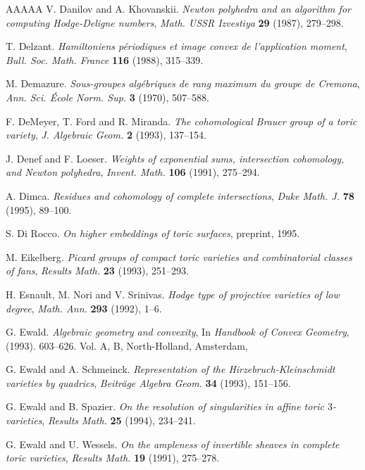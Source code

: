\documentclass{amsart}
\theoremstyle{plain}
\theoremstyle{definition}
\begin{document}
\begin{thebibliography}{AAAAA}
V. Danilov and A. Khovanskii. \textit{Newton polyhedra and an algorithm for computing Hodge-Deligne numbers}, \textit{Math. USSR Izvestiya} \textbf{29} (1987), 279--298.

T. Delzant. \textit{Hamiltoniens p\'eriodiques et image convex de l'application moment}, \textit{Bull. Soc. Math. France} \textbf{116} (1988), 315--339.

M. Demazure. \textit{Sous-groupes alg\'ebriques de rang maximum du groupe de Cremona}, \textit{Ann. Sci. \'Ecole Norm. Sup.} \textbf{3} (1970), 507--588.

F. DeMeyer, T. Ford and R. Miranda. \textit{The cohomological Brauer group of a toric variety}, \textit{J. Algebraic Geom.} \textbf{2} (1993), 137--154.

J. Denef and F. Loeser. \textit{Weights of exponential sums, intersection cohomology, and Newton polyhedra}, \textit{Invent. Math.} \textbf{106} (1991), 275--294.

A. Dimca. \textit{Residues and cohomology of complete intersections}, \textit{Duke Math. J.} \textbf{78} (1995), 89--100.

S. Di Rocco. \textit{On higher embeddings of toric surfaces}, preprint, 1995.

M. Eikelberg. \textit{Picard groups of compact toric varieties and combinatorial classes of fans}, \textit{Results Math.} \textbf{23} (1993), 251--293.

H. Esnault, M. Nori and V. Srinivas. \textit{Hodge type of projective varieties of low degree}, \textit{Math. Ann.} \textbf{293} (1992), 1--6.

G. Ewald. \textit{Algebraic geometry and convexity}, In \textit{Handbook of Convex Geometry}, (1993). 603--626. Vol. A, B, North-Holland, Amsterdam,

G. Ewald and A. Schmeinck. \textit{Representation of the Hirzebruch-Kleinschmidt varieties by quadrics}, \textit{Beitr\"age Algebra Geom.} \textbf{34} (1993), 151--156.

G. Ewald and B. Spazier. \textit{On the resolution of singularities in affine toric $3$-varieties}, \textit{Results Math.} \textbf{25} (1994), 234--241.

G. Ewald and U. Wessels. \textit{On the ampleness of invertible sheaves in complete toric varieties}, \textit{Results Math.} \textbf{19} (1991), 275--278.


\end{thebibliography}
\end{document}
